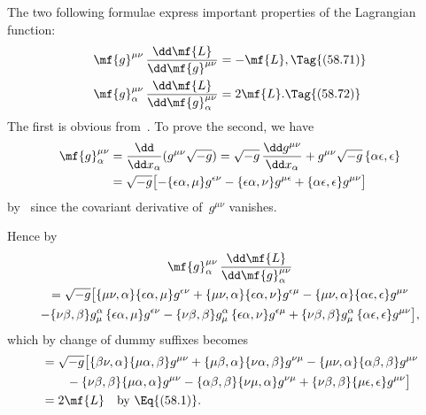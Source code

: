 \documentclass[12pt]{book}
\begin{document}
The two following formulae express important properties of the Lagrangian
function:
\begin{align*}
  \mf{g}^{\mu\nu}\, \frac{\dd\mf{L}}{\dd\mf{g}^{\mu\nu}}
  &= -\mf{L},
  \Tag{(58.71)} \\
  \mf{g}_{\alpha}^{\mu\nu}\, \frac{\dd\mf{L}}{\dd\mf{g}_{\alpha}^{\mu\nu}}
  &= 2\mf{L}.
  \Tag{(58.72)}
\end{align*}
The first is obvious from~. To prove the second, we have
\begin{align*}
  \mf{g}_{\alpha}^{\mu\nu}
  &= \frac{\dd}{\dd x_{\alpha}} (g^{\mu\nu} \sqrt{-g})
  = \sqrt{-g}\, \frac{\dd g^{\mu\nu}}{\dd x_{\alpha}} + g^{\mu\nu} \sqrt{-g}\, \{\alpha\epsilon, \epsilon\} \\
  &= \sqrt{-g} \bigl[-\{\epsilon\alpha, \mu\} g^{\epsilon\nu}
    - \{\epsilon\alpha, \nu\} g^{\mu\epsilon}
    + \{\alpha\epsilon, \epsilon\} g^{\mu\nu}\bigr]
\end{align*}
by~ since the covariant derivative of~$g^{\mu\nu}$ vanishes.

Hence by~
\begin{multline*}
  \mf{g}_{\alpha}^{\mu\nu}\, \frac{\dd\mf{L}}{\dd\mf{g}_{\alpha}^{\mu\nu}} \\
  = \sqrt{-g} \bigl[
    \{\mu\nu, \alpha\} \{\epsilon\alpha, \mu\} g^{\epsilon\nu}
    + \{\mu\nu, \alpha\} \{\epsilon\alpha, \nu\} g^{\epsilon\mu}
    - \{\mu\nu, \alpha\} \{\alpha\epsilon, \epsilon\} g^{\mu\nu} \\
    - \{\nu\beta, \beta\} g_{\mu}^{\alpha}\, \{\epsilon\alpha, \mu\} g^{\epsilon\nu}
    - \{\nu\beta, \beta\} g_{\mu}^{\alpha}\, \{\epsilon\alpha, \nu\} g^{\epsilon\mu}
    + \{\nu\beta, \beta\} g_{\mu}^{\alpha}\, \{\alpha\epsilon, \epsilon\} g^{\mu\nu}\bigr],
\end{multline*}
which by change of dummy suffixes becomes
\begin{align*}
  &= \sqrt{-g} \bigl[
      \{\beta\nu, \alpha\} \{\mu\alpha, \beta\} g^{\mu\nu}
    + \{\mu\beta, \alpha\} \{\nu\alpha, \beta\} g^{\nu\mu}
    - \{\mu\nu, \alpha\} \{\alpha\beta, \beta\} g^{\mu\nu} \\
    &\qquad
    - \{\nu\beta, \beta\} \{\mu\alpha, \alpha\} g^{\mu\nu}
    - \{\alpha\beta, \beta\} \{\nu\mu, \alpha\} g^{\nu\mu}
    + \{\nu\beta, \beta\} \{\mu\epsilon, \epsilon\} g^{\mu\nu}\bigr] \\
  &= 2\mf{L}\quad\text{by~\Eq{(58.1)}.}
\end{align*}
\end{document}
